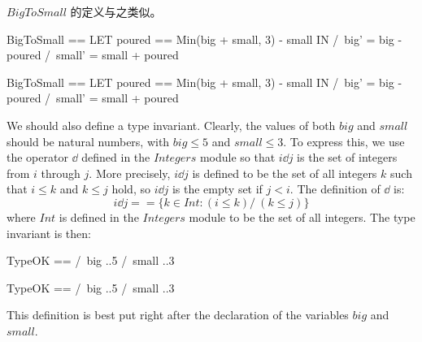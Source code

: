 \begin{ch}
  \tlasubaction{} $BigToSmall$ 的定义与之类似。
 \medskip
  \begin{twocols}
  \begin{notla}
  BigToSmall == 
    LET poured == Min(big + small, 3) - small
    IN  /\ big'   = big - poured
	/\ small' = small + poured
  \end{notla}
  \begin{tlatex}
  \end{tlatex}
  \midcol
  \begin{verbatim*}
  BigToSmall == 
    LET poured == Min(big + small, 3) - small
    IN  /\ big'   = big - poured
	/\ small' = small + poured
  \end{verbatim*}
  \end{twocols}
 \medskip
\end{ch}
We should also define a type invariant.  Clearly, the values of
both $big$ and $small$ should be natural numbers, with $big\leq 5$
and $small\leq3$.  To express this, we use the operator 
$\dd$ defined in the $Integers$ module so that $i\dd j$ is the set of
integers from $i$ through $j$.  More precisely, $i\dd j$ is defined to
be the set of all integers $k$ such that $i\leq k$ and $k\leq j$ hold,
so $i\dd j$ is the empty set if $j<i$.  The definition of $\dd$ is:%
 \[ i \dd j == \{k \in Int : (i \leq k) /\ (k \leq j)\}
 \]
where 
$Int$ is defined in the $Integers$ module to be the set of all
integers.   The type invariant is then:
 \medskip
\begin{twocols}
\begin{notla}
TypeOK == /\ big   ..5
          /\ small ..3 
\end{notla}
\begin{tlatex}
%
%
\end{tlatex}
\midcol
\begin{verbatim*}
TypeOK == /\ big   ..5
          /\ small ..3 
\end{verbatim*}
\end{twocols}
 \medskip
This definition is best put right after the declaration of the
variables $big$ and $small$.

